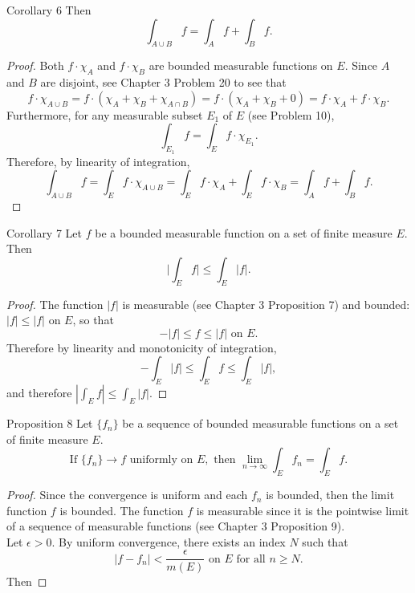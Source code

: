 \begin{flushleft}
\begin{namedthm*}{Corollary 6}
        Then
        \[
            \int_{A\cup B}f=\int_Af+\int_Bf.
        \]   
    \end{namedthm*}
    \begin{proof}
        Both $f\cdot\chi_A$ and $f\cdot\chi_B$ are bounded measurable functions on $E$.
        Since $A$ and $B$ are disjoint, see Chapter 3 Problem 20 to see that
        \[
            f\cdot\chi_{A\cup B}=f\cdot(\chi_A+\chi_B+\chi_{A\cap B})=f\cdot(\chi_A+\chi_B+0)=f\cdot\chi_A+f\cdot\chi_B.    
        \]
        Furthermore, for any measurable subset $E_1$ of $E$ (see Problem 10),
        \[
            \int_{E_1}f=\int_{E}f\cdot\chi_{E_1}.    
        \]
        Therefore, by linearity of integration,
        \[
            \int_{A\cup B}f= \int_{E}f\cdot\chi_{A\cup B}=\int_{E}f\cdot\chi_{A}+\int_{E}f\cdot\chi_{B}=\int_Af+\int_Bf.
        \]
    \end{proof}
    \begin{namedthm*}{Corollary 7}
        Let $f$ be a bounded measurable function on a set of finite measure $E$.
        Then
        \[
            \biggl|\int_Ef\biggr|\le\int_E|f|.
        \]
    \end{namedthm*}
    \begin{proof}
        The function $|f|$ is measurable (see Chapter 3 Proposition 7) and bounded: $|f|\le|f|$ on $E$, so that
        \[
            -|f|\le f\le|f|\text{ on }E.
        \]
        Therefore by linearity and monotonicity of integration,
        \[
            -\int_E|f|\le \int_Ef\le\int_E|f|,
        \]
        and therefore $|\int_Ef|\le\int_E|f|$.
    \end{proof}
    \begin{namedthm*}{Proposition 8}
        Let $\{f_n\}$ be a sequence of bounded measurable functions on a set of finite measure $E$.
        \[
            \text{If }\{f_n\}\to f\text{ uniformly on }E,\text{ then }\lim_{n\to\infty}\int_Ef_n=\int_Ef.    
        \]
    \end{namedthm*}
    \begin{proof}
        Since the convergence is uniform and each $f_n$ is bounded, then the limit function $f$ is bounded.
        The function $f$ is measurable since it is the pointwise limit of a sequence of measurable functions (see Chapter 3 Proposition 9).
        \\Let $\epsilon>0$.
        By uniform convergence, there exists an index $N$ such that 
        \[
            |f-f_n|<\frac{\epsilon}{m(E)}\text{ on $E$ for all }n\ge N. 
        \]
        Then

\end{proof}
\end{flushleft}
